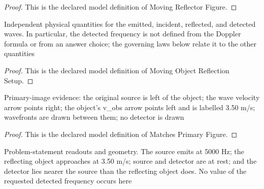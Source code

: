 \begin{proof}
  This is the declared model definition of Moving Reflector Figure.
\end{proof}
\begin{definition}
  \label{def:physics:phyx-mini-0214:phyxminiproblems-problemphyxmini0214-movingobjectreflectionsetup}
  Independent physical quantities for the emitted, incident, reflected, and detected waves. In particular, the detected frequency is not defined from the Doppler formula or from an answer choice; the governing laws below relate it to the other quantities
\end{definition}
\begin{proof}
  This is the declared model definition of Moving Object Reflection Setup.
\end{proof}
\begin{definition}
  \label{def:physics:phyx-mini-0214:phyxminiproblems-problemphyxmini0214-matchesprimaryfigure}
  Primary-image evidence: the original source is left of the object; the wave velocity arrow points right; the object's v\_obs arrow points left and is labelled 3.50 m/s; wavefronts are drawn between them; no detector is drawn
\end{definition}
\begin{proof}
  This is the declared model definition of Matches Primary Figure.
\end{proof}
\begin{definition}
  \label{def:physics:phyx-mini-0214:phyxminiproblems-problemphyxmini0214-matchesproblemreadouts}
  Problem-statement readouts and geometry. The source emits at 5000 Hz; the reflecting object approaches at 3.50 m/s; source and detector are at rest; and the detector lies nearer the source than the reflecting object does. No value of the requested detected frequency occurs here
\end{definition}

